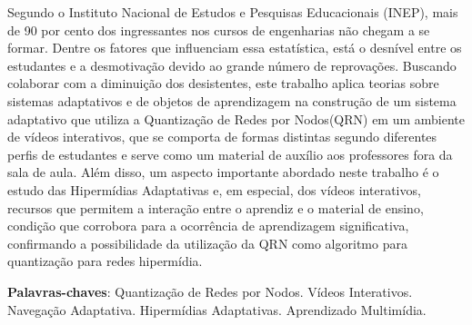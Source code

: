 \begin{resumo}
Segundo o Instituto Nacional de Estudos e Pesquisas Educacionais (INEP), mais de 90 por cento dos ingressantes nos cursos de engenharias não chegam a se formar. Dentre os fatores que influenciam essa estatística, está o desnível entre os estudantes e a desmotivação devido ao grande número de reprovações. Buscando colaborar com a diminuição dos desistentes, este trabalho aplica teorias sobre sistemas adaptativos e de objetos de aprendizagem na construção de um sistema adaptativo que utiliza a Quantização de Redes por Nodos(QRN) em um ambiente de vídeos interativos, que se comporta de formas distintas segundo diferentes perfis de estudantes e serve como um material de auxílio aos professores fora da sala de aula. Além disso, um aspecto importante abordado neste trabalho é o estudo das Hipermídias Adaptativas e, em especial, dos vídeos interativos, recursos que permitem a interação entre o aprendiz e o material de ensino, condição que corrobora para a ocorrência de aprendizagem significativa, confirmando a possibilidade da utilização da QRN como algoritmo para quantização para redes hipermídia.

 \vspace{\onelineskip}
    
 \noindent
 \textbf{Palavras-chaves}: Quantização de Redes por Nodos. Vídeos Interativos. Navegação Adaptativa. Hipermídias Adaptativas. Aprendizado Multimídia.
\end{resumo}
